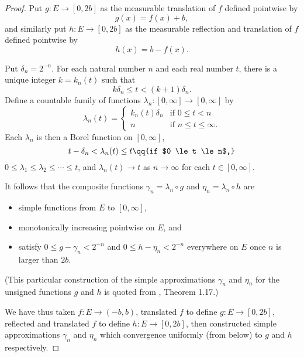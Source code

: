 \documentclass[onesided]{ccg-pset}
\begin{document}
\begin{enumerate}
\begin{proof}
Put $g\colon E \to [0,2b]$ as the measurable translation of $f$ defined pointwise by \[g(x) = f(x) + b,\]
and similarly put $h\colon E \to [0,2b]$ as the measurable reflection and translation of $f$ defined pointwise by 
\begin{equation*}
    h(x) = b - f(x).
\end{equation*}

Put $\delta_n = 2^{-n}$.  For each natural number $n$ and each real number $t$, there is a unique integer $k = k_n(t)$ such that 
\[
    k\delta_n \le t < (k+1)\delta_n.
\]
Define a countable family of functions $\lambda_n \colon [0, \infty] \to [0,\infty]$ by
\begin{equation*}
\lambda_n(t) = 
\begin{cases}
    k_n(t)\delta_n & \text{if $0 \le t < n$}\\
    n & \text{if $n \le t \le \infty$}.
\end{cases}
\end{equation*}
Each $\lambda_n$ is then a Borel function on $[0, \infty]$, 
\begin{equation*}
    t - \delta_n < \lambda_n(t) \le t \qq{if $0 \le t \le n$,}
\end{equation*}
$0 \le \lambda_1 \le \lambda_2 \le \cdots \le t$, and $\lambda_n(t) \to t$ as $n \to \infty$ for each $t \in [0,\infty]$. 

It follows that the composite functions $\gamma_n = \lambda_n \circ g$ and $\eta_n = \lambda_n \circ h$ are 
\begin{itemize}
    \item simple functions from $E$ to $[0, \infty]$, 
    \item monotonically increasing pointwise on $E$, and 
    \item satisfy $0 \le g - \gamma_n < 2^{-n}$ and $0 \le h - \eta_n < 2^{-n}$ everywhere on $E$ once $n$ is larger than $2b$.
\end{itemize}

(This particular construction of the simple approximations $\gamma_n$ and $\eta_n$ for the unsigned functions $g$ and $h$ is quoted from \cite{Rud87}, Theorem 1.17.)

We have thus taken $f \colon E \to (-b,b)$, translated $f$ to define $g \colon E \to [0, 2b]$, reflected and translated $f$ to define $h \colon E \to [0,2b]$, then constructed simple approximations $\gamma_n$ and $\eta_n$ which convergence uniformly (from below) to $g$ and $h$ respectively. 


\end{proof}
\end{enumerate}
\end{document}
